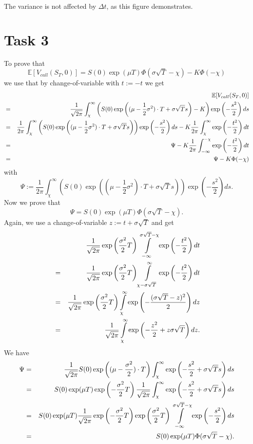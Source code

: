 \documentclass[10pt,a4paper]{article}
\begin{document}
The variance is not affected by $\Delta t$, as this figure demonstrates. 

\section*{Task 3}
To prove that
\[
\mathbb{E}[V_{call}(S_T,0)]=S(0)\exp(\mu T)\Phi(\sigma\sqrt{T}-\chi)-K\Phi(-\chi)
\]
we use that by change-of-variable with $t:=-t$ we get
\begin{eqnarray}
&&\mathbb{E}[V_{call}(S_T,0)] \notag\\
&=&\frac{1}{\sqrt{2\pi}}\int_{\chi}^{\infty}\left(S(0)\exp\left((\mu-\frac{1}{2}\sigma^2)\cdot T+\sigma\sqrt{T}s\right)-K\right)\exp\left(-\frac{s^2}{2}\right)ds \notag\\
&=&\frac{1}{2\pi}\int_{\chi}^{\infty}\left(S(0)\exp\left((\mu-\frac{1}{2}\sigma^2)\cdot T+\sigma\sqrt{T}s\right)\right)\exp\left(-\frac{s^2}{2}\right)ds-K\frac{1}{2\pi}\int_{\chi}^{\infty}\exp\left(-\frac{t^2}{2}\right)dt \notag\\
&=&\Psi-K\frac{1}{2\pi}\int_{-\infty}^{-\chi}\exp\left(-\frac{t^2}{2}\right)dt \notag\\
&=&\Psi-K\Phi(-\chi) \notag
\end{eqnarray}
with
\[
\Psi:=\frac{1}{2\pi}\int_{\chi}^{\infty}\left(S(0)\exp\left((\mu-\frac{1}{2}\sigma^2)\cdot T+\sigma\sqrt{T}s\right)\right)\exp\left(-\frac{s^2}{2}\right)ds.
\]
Now we prove that
\[
\Psi=S(0)\exp(\mu T)\Phi(\sigma\sqrt{T}-\chi).
\]
Again, we use a change-of-variable $z:=t+\sigma\sqrt{T}$ and get
\begin{eqnarray}
&&\frac{1}{\sqrt{2\pi}}\exp\left(\frac{\sigma^2}{2}T\right)\int\limits_{-\infty}^{\sigma\sqrt{T}-\chi}\exp\left(-\frac{t^2}{2}\right)dt \notag\\
&=&\frac{1}{\sqrt{2\pi}}\exp\left(\frac{\sigma^2}{2}T\right)\int\limits_{\chi-\sigma\sqrt{T}}^{\infty}\exp\left(-\frac{t^2}{2}\right)dt \notag\\
&=&\frac{1}{\sqrt{2\pi}}\exp\left(\frac{\sigma^2}{2}T\right)\int\limits_{\chi}^{\infty}\exp\left(-\frac{(\sigma\sqrt{T}-z)^2}{2}\right)dz \notag\\
&=&\frac{1}{\sqrt{2\pi}}\int\limits_{\chi}^{\infty}\exp\left(-\frac{z^2}{2}+z\sigma\sqrt{T}\right)dz. \notag
\end{eqnarray}
We have
\begin{eqnarray}
\Psi&=&\frac{1}{\sqrt{2\pi}}S(0)\exp\left((\mu-\frac{\sigma^2}{2})\cdot T\right)\int_{\chi}^{\infty}\exp\left(-\frac{s^2}{2}+\sigma\sqrt{T}s\right)ds \notag\\
&=&S(0)\exp(\mu T)\exp\left(-\frac{\sigma^2}{2}T\right)\frac{1}{\sqrt{2\pi}}\int_{\chi}^{\infty}\exp\left(-\frac{s^2}{2}+\sigma\sqrt{T}s\right)ds \notag\\
&=&S(0)\exp(\mu T)\frac{1}{\sqrt{2\pi}}\exp\left(-\frac{\sigma^2}{2}T\right)\exp\left(\frac{\sigma^2}{2}T\right)\int\limits_{-\infty}^{\sigma\sqrt{T}-\chi}\exp\left(-\frac{s^2}{2}\right)ds \notag\\
&=&S(0)\exp(\mu T)\Phi(\sigma\sqrt{T}-\chi). \notag
\end{eqnarray}
\end{document}
